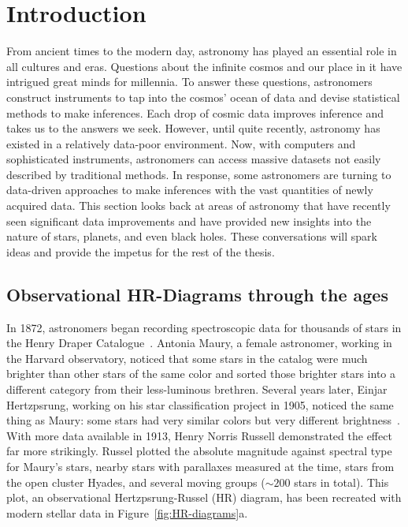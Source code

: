  \chapter{Introduction}
\label{cp.intro}

From ancient times to the modern day, astronomy has played an essential role in all cultures and eras.
Questions about the infinite cosmos and our place in it have intrigued great minds for millennia.
To answer these questions, astronomers construct instruments to tap into the cosmos' ocean of data and devise statistical methods to make inferences.
Each drop of cosmic data improves inference and takes us to the answers we seek.
However, until quite recently, astronomy has existed in a relatively data-poor environment. 
Now, with computers and sophisticated instruments, astronomers can access massive datasets not easily described by traditional methods.
In response, some astronomers are turning to data-driven approaches to make inferences with the vast quantities of newly acquired data.
This section looks back at areas of astronomy that have recently seen significant data improvements and have provided new insights into the nature of stars, planets, and even black holes.
These conversations will spark ideas and provide the impetus for the rest of the thesis.


\section{Observational HR-Diagrams through the ages}

In 1872, astronomers began recording spectroscopic data for thousands of stars in the Henry Draper Catalogue~\citeme.
Antonia Maury, a female astronomer, working in the Harvard observatory, noticed that some stars in the catalog were much brighter than other stars of the same color and sorted those brighter stars into a different category from their less-luminous brethren. 
Several years later, Einjar Hertzpsrung, working on his star classification project in 1905, noticed the same thing as Maury: some stars had very similar colors but very different brightness~\citeme.
With more data available in 1913, Henry Norris Russell demonstrated the effect far more strikingly. 
Russel plotted the absolute magnitude against spectral type for Maury's stars, nearby stars with parallaxes measured at the time, stars from the open cluster Hyades, and several moving groups ($\sim200$ stars in total). 
This plot, an observational Hertzpsrung-Russel (HR) diagram, has been recreated with modern stellar data in Figure~\ref{fig:HR-diagrams}a.

